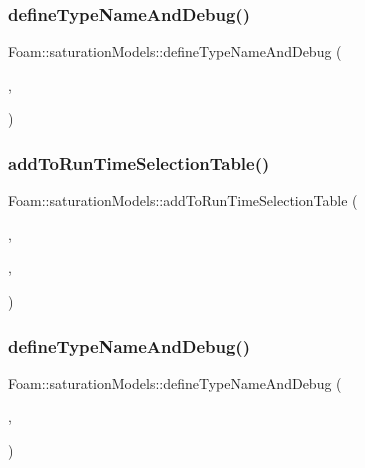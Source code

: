 \subsubsection{\texorpdfstring{define\+Type\+Name\+And\+Debug()}{defineTypeNameAndDebug()}\hspace{0.1cm}{\footnotesize\ttfamily [3/4]}}
{\footnotesize\ttfamily Foam\+::saturation\+Models\+::define\+Type\+Name\+And\+Debug (\begin{DoxyParamCaption}\item[{\hyperlink{classFoam_1_1saturationModels_1_1water}{water}}]{,  }\item[{0}]{ }\end{DoxyParamCaption})}

\mbox{\label{namespaceFoam_1_1saturationModels_afcb497101cd25d4c30cc8695d2df2bab}} 
\subsubsection{\texorpdfstring{add\+To\+Run\+Time\+Selection\+Table()}{addToRunTimeSelectionTable()}\hspace{0.1cm}{\footnotesize\ttfamily [3/4]}}
{\footnotesize\ttfamily Foam\+::saturation\+Models\+::add\+To\+Run\+Time\+Selection\+Table (\begin{DoxyParamCaption}\item[{\hyperlink{classFoam_1_1saturationModel}{saturation\+Model}}]{,  }\item[{\hyperlink{classFoam_1_1saturationModels_1_1water}{water}}]{,  }\item[{saturation\+Models}]{ }\end{DoxyParamCaption})}

\mbox{\label{namespaceFoam_1_1saturationModels_a387131a2a1f830d0c7500dd8eb77f5ad}} 
\subsubsection{\texorpdfstring{define\+Type\+Name\+And\+Debug()}{defineTypeNameAndDebug()}\hspace{0.1cm}{\footnotesize\ttfamily [4/4]}}
{\footnotesize\ttfamily Foam\+::saturation\+Models\+::define\+Type\+Name\+And\+Debug (\begin{DoxyParamCaption}\item[{\hyperlink{classFoam_1_1saturationModels_1_1waterTRACE}{water\+T\+R\+A\+CE}}]{,  }\item[{0}]{ }\end{DoxyParamCaption})}


